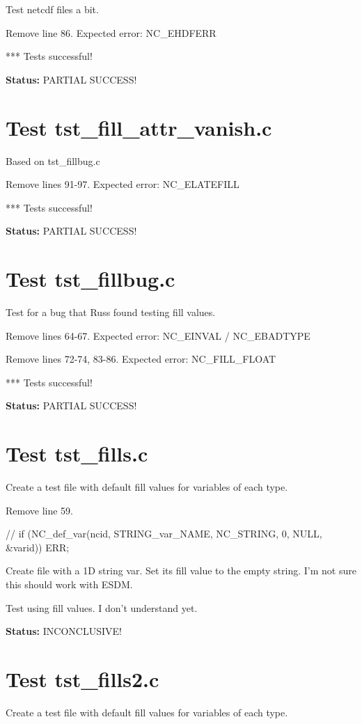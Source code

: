 Test netcdf files a bit.

Remove line 86. Expected error: NC\_EHDFERR

*** Tests successful!

{\bf \large Status: } PARTIAL SUCCESS!

\section{Test tst\_fill\_attr\_vanish.c}

Based on tst\_fillbug.c

Remove lines 91-97. Expected error: NC\_ELATEFILL

*** Tests successful!

{\bf \large Status: } PARTIAL SUCCESS!

\section{Test tst\_fillbug.c}

Test for a bug that Russ found testing fill values.

Remove lines 64-67. Expected error: NC\_EINVAL / NC\_EBADTYPE

Remove lines 72-74, 83-86. Expected error: NC\_FILL\_FLOAT

*** Tests successful!

{\bf \large Status: } PARTIAL SUCCESS!

\section{Test tst\_fills.c}

Create a test file with default fill values for variables of each type.

Remove line 59.

// if (NC\_def\_var(ncid, STRING\_var\_NAME, NC\_STRING, 0, NULL, \&varid)) ERR;

Create file with a 1D string var. Set its fill value to the empty string.
I'm not sure this should work with ESDM.

Test using fill values. I don't understand yet.

{\bf \large Status: } INCONCLUSIVE!

\section{Test tst\_fills2.c}

Create a test file with default fill values for variables of each type.

